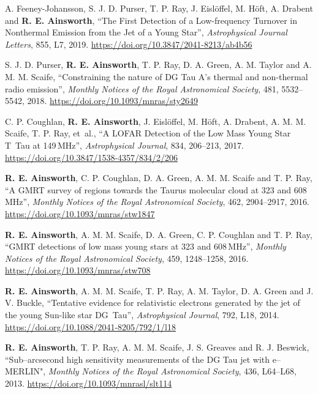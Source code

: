 \begin{cvpubs}
  \cvpub
    {
      \begin{cvetar}
      \item{A. Feeney-Johansson, S. J. D. Purser, T. P. Ray,  J. Eisl{\"o}ffel, M. H{\"o}ft, A. Drabent and \textbf{R. E. Ainsworth}, ``The First Detection of a Low-frequency Turnover in Nonthermal Emission from the Jet of a Young Star'', \textit{Astrophysical Journal Letters}, 855, L7, 2019. \url{https://doi.org/10.3847/2041-8213/ab4b56}}
       \item {S. J. D. Purser, \textbf{R. E. Ainsworth}, T. P. Ray, D. A. Green, A. M. Taylor and A. M. M. Scaife, ``Constraining the nature of DG Tau A's thermal and non-thermal radio emission'', \textit{Monthly Notices of the Royal Astronomical Society}, 481, 5532--5542, 2018. \url{https://doi.org/10.1093/mnras/sty2649}}
        \item {C. P. Coughlan, \textbf{R. E. Ainsworth}, J. Eisl{\"o}ffel, M. H{\"o}ft, A. Drabent, A. M. M. Scaife, T. P. Ray, et~al., ``A LOFAR Detection of the Low Mass Young Star T~Tau at 149\,MHz'', \textit{Astrophysical Journal}, 834, 206--213, 2017. \url{https://doi.org/10.3847/1538-4357/834/2/206}}
        \item {\textbf{R. E. Ainsworth}, C. P. Coughlan, D. A. Green, A. M. M. Scaife and T. P. Ray, ``A GMRT survey of regions towards the Taurus molecular cloud at 323 and 608\,MHz'', \textit{Monthly Notices of the Royal Astronomical Society}, 462, 2904--2917, 2016. \url{https://doi.org/10.1093/mnras/stw1847}}
        \item {\textbf{R. E. Ainsworth}, A. M. M. Scaife, D. A. Green, C. P. Coughlan and T. P. Ray, ``GMRT detections of low mass young stars at 323 and 608\,MHz'', \textit{Monthly Notices of the Royal Astronomical Society}, 459, 1248--1258, 2016. \url{https://doi.org/10.1093/mnras/stw708}}
        \item {\textbf{R. E. Ainsworth}, A. M. M. Scaife, T. P. Ray, A. M. Taylor, D. A. Green and J. V. Buckle, ``Tentative evidence for relativistic electrons generated by the jet of the young Sun-like star DG~Tau'', \textit{Astrophysical Journal}, 792, L18, 2014. \url{https://doi.org/10.1088/2041-8205/792/1/l18}}
        \item {\textbf{R. E. Ainsworth}, T. P. Ray, A. M. M. Scaife, J. S. Greaves and R. J. Beswick, ``Sub--arcsecond high sensitivity measurements of the DG Tau jet with e--MERLIN", \textit{Monthly Notices of the Royal Astronomical Society}, 436, L64--L68, 2013. \url{https://doi.org/10.1093/mnrasl/slt114}}

\end{cvetar}}
\end{cvpubs}

